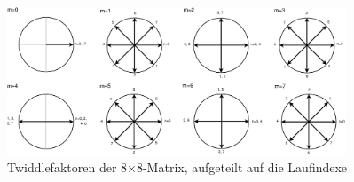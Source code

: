  


\begin{figure}[!ht]
 \centering
 \includegraphics[width=0.9\textwidth]{img/Twiddlefaktoren_Einheitskreis.eps}
 \caption{Twiddlefaktoren der 8$\times$8-Matrix, aufgeteilt auf die Laufindexe}
 \label{pic:Twiddlefaktoren_Darstellung8x8}
\end{figure}

\vspace{0.5cm}


 

